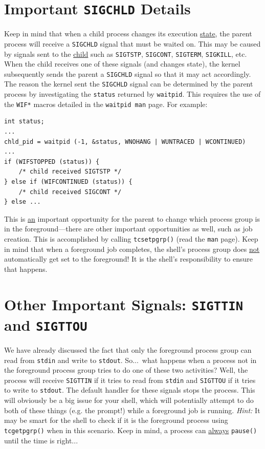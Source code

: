 \documentclass[10pt]{article}
\begin{document}
\section{Important \texttt{SIGCHLD} Details}

Keep in mind that when a child process changes its execution
\underline{state}, the parent process will receive a \texttt{SIGCHLD}
signal that must be waited on.  This may be caused by signals sent to
the \underline{child} such as \texttt{SIGTSTP}, \texttt{SIGCONT},
\texttt{SIGTERM}, \texttt{SIGKILL}, etc.  When the child receives one of
these signals (and changes state), the kernel subsequently sends the
parent a \texttt{SIGCHLD} signal so that it may act accordingly.  The
reason the kernel sent the \texttt{SIGCHLD} signal can be determined by
the parent process by investigating the \texttt{status} returned by
\texttt{waitpid}. This requires the use of the \texttt{WIF*} macros
detailed in the \texttt{waitpid man} page. For example:

\begin{verbatim}
int status;
...
chld_pid = waitpid (-1, &status, WNOHANG | WUNTRACED | WCONTINUED)
...
if (WIFSTOPPED (status)) {
    /* child received SIGTSTP */
} else if (WIFCONTINUED (status)) {
    /* child received SIGCONT */
} else ...
\end{verbatim}

This is \underline{an} important opportunity for the parent to change
which process group is in the foreground---there are other important
opportunities as well, such as job creation.  This is accomplished by
calling \texttt{tcsetpgrp()} (read the \texttt{man} page).  Keep in mind
that when a foreground job completes, the shell's process group does
\underline{not} automatically get set to the foreground!  It is the
shell's responsibility to ensure that happens.



\section{Other Important Signals: \texttt{SIGTTIN} and \texttt{SIGTTOU}}

We have already discussed the fact that only the foreground process
group can read from \texttt{stdin} and write to \texttt{stdout}.  So...\
what happens when a process not in the foreground process group tries to
do one of these two activities?  Well, the process will receive
\texttt{SIGTTIN} if it tries to read from \texttt{stdin} and
\texttt{SIGTTOU} if it tries to write to \texttt{stdout}.  The default
handler for these signals stops the process.  This will obviously be a
big issue for your shell, which will potentially attempt to do both of
these things (e.g. the prompt!) while a foreground job is running.
\emph{Hint:} It may be smart for the shell to check if it is the
foreground process using \texttt{tcgetpgrp()} when in this scenario.
Keep in mind, a process can \underline{always} \texttt{pause()} until the
time is right...
\end{document}
